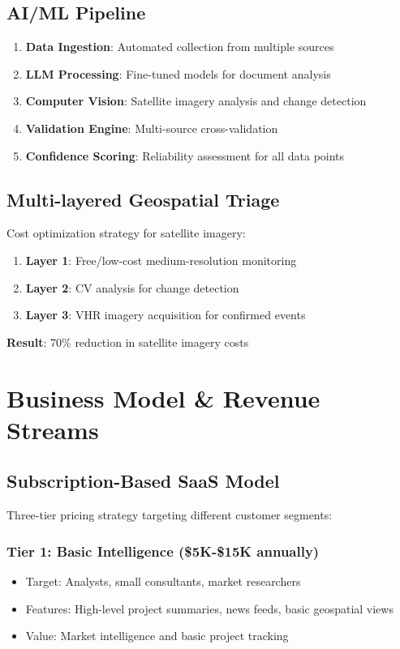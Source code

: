 \documentclass[business]{../templates/infraradar-main}
\begin{document}
\subsection{AI/ML Pipeline}
\begin{enumerate}
    \item \textbf{Data Ingestion}: Automated collection from multiple sources
    \item \textbf{LLM Processing}: Fine-tuned models for document analysis
    \item \textbf{Computer Vision}: Satellite imagery analysis and change detection
    \item \textbf{Validation Engine}: Multi-source cross-validation
    \item \textbf{Confidence Scoring}: Reliability assessment for all data points
\end{enumerate}

\subsection{Multi-layered Geospatial Triage}
Cost optimization strategy for satellite imagery:
\begin{enumerate}
    \item \textbf{Layer 1}: Free/low-cost medium-resolution monitoring
    \item \textbf{Layer 2}: CV analysis for change detection
    \item \textbf{Layer 3}: VHR imagery acquisition for confirmed events
\end{enumerate}
\textbf{Result}: 70\% reduction in satellite imagery costs

\section{Business Model \& Revenue Streams}

\subsection{Subscription-Based SaaS Model}
Three-tier pricing strategy targeting different customer segments:

\subsubsection{Tier 1: Basic Intelligence (\$5K-\$15K annually)}
\begin{itemize}
    \item Target: Analysts, small consultants, market researchers
    \item Features: High-level project summaries, news feeds, basic geospatial views
    \item Value: Market intelligence and basic project tracking
\end{itemize}
\end{document}

